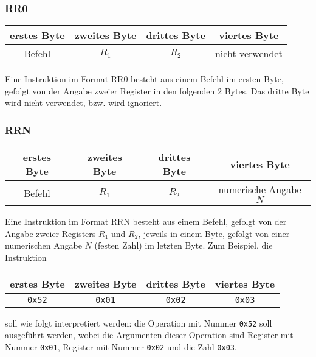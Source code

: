 \subsubsection{RR0}
\label{RR0}

\begin{center}
  \begin{tabular}{|*{4}{c|}} \hline
    erstes Byte  & zweites Byte  & drittes Byte  & viertes Byte \\\hline\hline
    Befehl       & $R_{1}$       & $R_{2}$ &  nicht verwendet   \\\hline
  \end{tabular}
\end{center}
Eine Instruktion im Format RR0 besteht aus einem Befehl im ersten Byte, gefolgt
von der Angabe zweier Register in den folgenden 2 Bytes.
Das dritte Byte wird nicht verwendet, bzw. wird ignoriert.


\subsubsection{RRN}
\label{RRN}

\begin{center}
  \begin{tabular}{|*{4}{c|}} \hline
    erstes Byte  & zweites Byte  & drittes Byte  & viertes Byte \\\hline\hline
    Befehl       & $R_{1}$       & $R_{2}$ & numerische Angabe $N$  \\\hline
  \end{tabular}
\end{center}
Eine Instruktion im Format RRN besteht aus einem Befehl, gefolgt von der
Angabe zweier Registers $R_{1}$ und $R_{2}$, jeweils in einem Byte, gefolgt von
einer numerischen Angabe $N$ (festen Zahl) im letzten Byte. Zum Beispiel, die
Instruktion
\begin{center}
  \begin{tabular}{|*{4}{c|}} \hline
    erstes Byte & zweites Byte  & drittes Byte  & viertes Byte \\\hline\hline
    \texttt{0x52} & \texttt{0x01} & \texttt{0x02} & \texttt{0x03} \\\hline
  \end{tabular}
\end{center}
soll wie folgt interpretiert werden: 
die Operation mit Nummer \texttt{0x52} soll ausgeführt werden, wobei die
Argumenten dieser Operation sind Register mit Nummer \texttt{0x01}, Register mit
Nummer \texttt{0x02} und die Zahl \texttt{0x03}.



